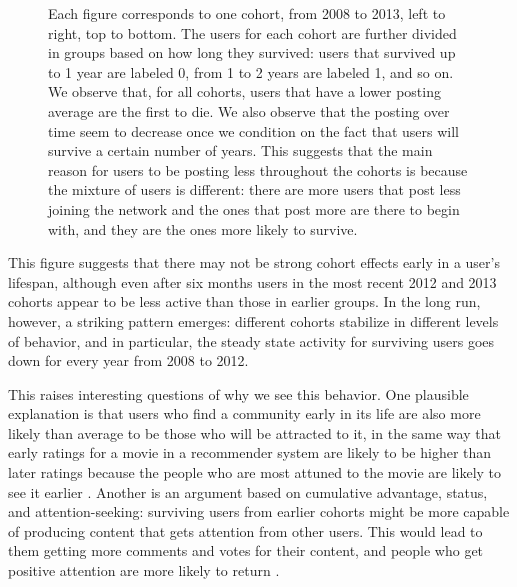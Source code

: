 \begin{figure}[!tb]
\caption{Each figure corresponds to one cohort, from 2008 to 2013, left to right, top to bottom. The users for each cohort are further divided in groups based on how long they survived: users that survived up to 1 year are labeled 0, from 1 to 2 years are labeled 1, and so on. We observe that, for all cohorts, users that have a lower posting average are the first to die. We also observe that the posting  over time seem to decrease once we condition on the fact that users will survive a certain number of years. This suggests that the main reason for users to be posting less throughout the cohorts is because the mixture of users is different: there are more users that post less joining the network and the ones that post more are there to begin with, and they are the ones more likely to survive.}
\label{fig:avr_posts_per_user_for_surviving_year}
\end{figure}

This figure suggests that there may not be strong cohort effects early in a user's lifespan, although even after six months users in the most recent 2012 and 2013 cohorts appear to be less active than those in earlier groups.  In the long run, however, a striking pattern emerges: different cohorts stabilize in different levels of behavior, and in particular, the steady state activity for surviving users goes down for every year from 2008 to 2012.  

This raises interesting questions of why we see this behavior.  One plausible explanation is that users who find a community early in its life are also more likely than average to be those who will be attracted to it, in the same way that early ratings for a movie in a recommender system are likely to be higher than later ratings because the people who are most attuned to the movie are likely to see it earlier \cite{if_we_can_find_one}.  Another is an argument based on cumulative advantage, status, and attention-seeking: surviving users from earlier cohorts might be more capable of producing content that gets attention from other users.  This would lead to them getting more comments and votes for their content, and people who get positive attention are more likely to return \cite{joyce-kraut, wikipedia, everything2_papers}.  

